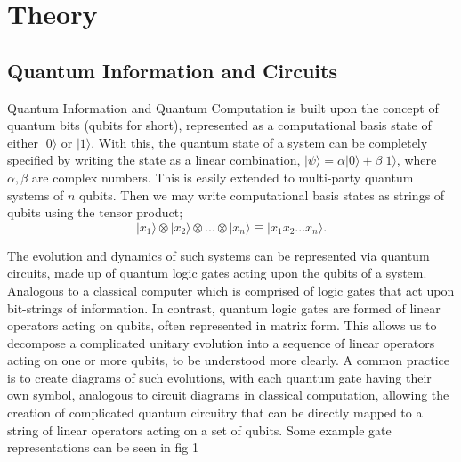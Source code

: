 \section{Theory}
\subsection{Quantum Information and Circuits}
\vspace{-0.15in}
Quantum Information and Quantum Computation is built upon the concept of quantum bits (qubits for short),
represented as a computational basis state of either $|0\rangle$ or $|1\rangle$. With this, the
quantum state of a system can be completely specified by writing the state as a linear combination,
$|\psi\rangle = \alpha |0\rangle + \beta |1\rangle$, where $\alpha, \beta$ are complex numbers.
This is easily extended to multi-party quantum systems of $n$ qubits. Then we may write computational
basis states as strings of qubits using the tensor product;
\[|x_1\rangle \otimes |x_2\rangle \otimes ... \otimes |x_n\rangle \equiv |x_1 x_2... x_n \rangle. \]

The evolution and dynamics of such systems can be represented via quantum circuits, made up of quantum logic gates acting
upon the qubits of a system. Analogous to a classical computer which is comprised of logic gates that act upon
bit-strings of information. In contrast, quantum logic gates are formed of linear operators acting 
on qubits, often represented in matrix form. This allows us to decompose a complicated unitary evolution into a 
sequence of linear operators acting on one or more qubits, to be understood more clearly. A common practice is to create 
diagrams of such evolutions, with each quantum gate having their own symbol, analogous to circuit diagrams in classical
computation, allowing the creation of complicated quantum circuitry that can be directly mapped to a string of linear 
operators acting on a set of qubits. Some example gate representations can be seen in fig 1




